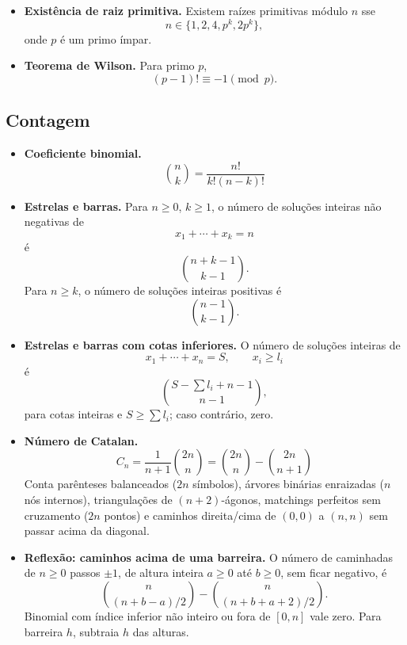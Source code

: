 \begin{itemize}[leftmargin=*,label={}]
\item \textbf{Existência de raiz primitiva.}
		Existem raízes primitivas módulo $n$ sse
		\[
			n \in \{1,2,4,p^k,2p^k\},
		\]
		onde $p$ é um primo ímpar.

		\ifextended
	\item \textbf{Teorema de Wilson.}
		Para primo $p$,
		\[
			(p-1)! \equiv -1 \pmod p.
		\]
		\fi
\end{itemize}


\subsection{Contagem}
\begin{itemize}[leftmargin=*,label={}]
		\ifextended
	\item \textbf{Coeficiente binomial.}
		\[
			\binom{n}{k}=\frac{n!}{k!(n-k)!}
		\]
		\fi

	\ifextended
	\item \textbf{Estrelas e barras.}
		Para $n\ge0$, $k\ge1$, o número de soluções inteiras não negativas de
		\[
			x_1+\cdots+x_k=n
		\]
		é
		\[
			\binom{n+k-1}{k-1}.
		\]
		Para $n\ge k$, o número de soluções inteiras positivas é
		\[
			\binom{n-1}{k-1}.
		\]
	\fi

		\ifextended
	\item \textbf{Estrelas e barras com cotas inferiores.}
		O número de soluções inteiras de
		\[
			x_1+\cdots+x_n = S,\qquad x_i\ge l_i
		\]
		é
		\[
			\binom{S-\sum l_i+n-1}{n-1},
		\]
		para cotas inteiras e $S\ge\sum l_i$; caso contrário, zero.
		\fi

	\item \textbf{Número de Catalan.}
		\[
			C_n=\frac{1}{n+1}\binom{2n}{n}
			=\binom{2n}{n}-\binom{2n}{n+1}
		\]
		\ifextended
		Conta parênteses balanceados ($2n$ símbolos), árvores binárias enraizadas ($n$ nós internos), triangulações de $(n+2)$-ágonos, matchings perfeitos sem cruzamento ($2n$ pontos) e caminhos direita/cima de $(0,0)$ a $(n,n)$ sem passar acima da diagonal.
		\fi

\item \textbf{Reflexão: caminhos acima de uma barreira.}
O número de caminhadas de $n\ge0$ passos $\pm1$, de altura inteira $a\ge0$ até $b\ge0$, sem ficar negativo, é
\[
\binom n{(n+b-a)/2}-\binom n{(n+b+a+2)/2}.
\]
Binomial com índice inferior não inteiro ou fora de $[0,n]$ vale zero. Para barreira $h$, subtraia $h$ das alturas.


\end{itemize}
